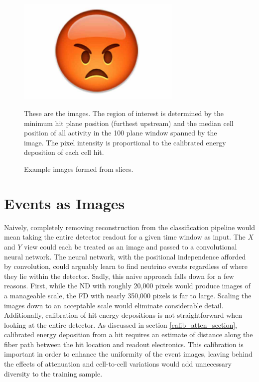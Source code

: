\begin{figure}[t]
\begin{center}
\includegraphics[width=0.7\textwidth]{figures/dummy/dummy.jpg}
\end{center}
\caption{Example images formed from \nova slices.}{
These are the images.  The region of interest is determined by the minimum hit
plane position (furthest upstream) and the median cell position of all activity
in the 100 plane window spanned by the image.
The pixel intensity is proportional to the calibrated energy deposition
of each cell hit.}
\label{pixelmap}
\end{figure}


\section{\nova Events as Images}

Naively, completely removing reconstruction from the classification pipeline
would mean taking the entire detector readout for a given time window
as input.  The $X$ and $Y$ view could each be treated as an image and passed
to a convolutional neural network.
The neural network, with the positional independence afforded by convolution,
could arguably learn to find neutrino events regardless of where they lie
within the detector.
Sadly, this naive approach falls down for a few reasons.
First, while the ND with roughly 20,000 pixels would produce images of a
manageable scale, the FD with nearly 350,000 pixels is far to large.
Scaling the images down to an acceptable scale would eliminate considerable
detail.
Additionally, calibration of hit energy depositions is not straightforward
when looking at the entire detector.
As discussed in section \ref{calib_atten_section}, calibrated energy deposition
from a hit requires an estimate of distance along the fiber path
between the hit location and readout electronics.
This calibration is important in order to enhance the uniformity of the
event images, leaving behind the effects of attenuation and cell-to-cell
variations would add unnecessary diversity to the training sample.

